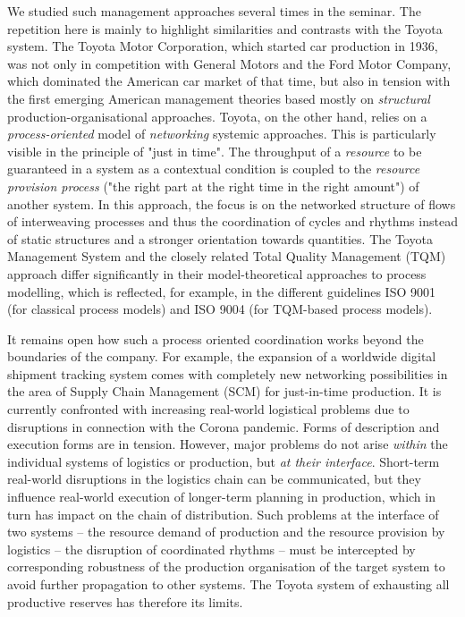 \documentclass[11pt,a4paper]{article}
\begin{document}
We studied such management approaches several times in the seminar. The
repetition here is mainly to highlight similarities and contrasts with the
Toyota system.  The Toyota Motor Corporation, which started car production in
1936, was not only in competition with General Motors and the Ford Motor
Company, which dominated the American car market of that time, but also in
tension with the first emerging American management theories based mostly on
\emph{structural} production-organisational approaches. Toyota, on the other
hand, relies on a \emph{process-oriented} model of \emph{networking} systemic
approaches. This is particularly visible in the principle of "just in time".
The throughput of a \emph{resource} to be guaranteed in a system as a
contextual condition is coupled to the \emph{resource provision process} ("the
right part at the right time in the right amount") of another system. In this
approach, the focus is on the networked structure of flows of interweaving
processes and thus the coordination of cycles and rhythms instead of static
structures and a stronger orientation towards quantities. The Toyota
Management System and the closely related Total Quality Management (TQM)
approach differ significantly in their model-theoretical approaches to process
modelling, which is reflected, for example, in the different guidelines ISO
9001 (for classical process models) and ISO 9004 (for TQM-based process
models).

It remains open how such a process oriented coordination works beyond the
boundaries of the company. For example, the expansion of a worldwide digital
shipment tracking system comes with completely new networking possibilities in
the area of Supply Chain Management (SCM) for just-in-time production.  It is
currently confronted with increasing real-world logistical problems due to
disruptions in connection with the Corona pandemic. Forms of description and
execution forms are in tension. However, major problems do not arise
\emph{within} the individual systems of logistics or production, but \emph{at
  their interface}.  Short-term real-world disruptions in the logistics chain
can be communicated, but they influence real-world execution of longer-term
planning in production, which in turn has impact on the chain of distribution.
Such problems at the interface of two systems -- the resource demand of
production and the resource provision by logistics -- the disruption of
coordinated rhythms -- must be intercepted by corresponding robustness of the
production organisation of the target system to avoid further propagation to
other systems. The Toyota system of exhausting all productive reserves has
therefore its limits.
\end{document}
